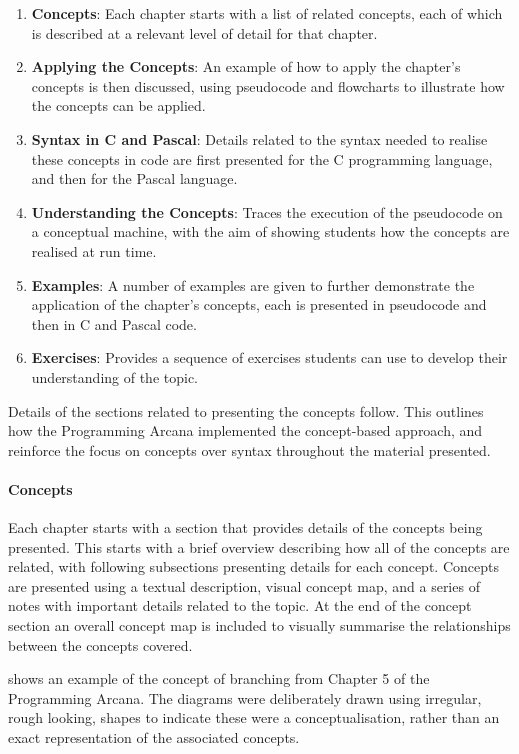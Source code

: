 \begin{enumerate}
  \item \textbf{Concepts}: Each chapter starts with a list of related concepts, each of which is described at a relevant level of detail for that chapter.
  \item \textbf{Applying the Concepts}: An example of how to apply the chapter's concepts is then discussed, using pseudocode and flowcharts to illustrate how the concepts can be applied.
  \item \textbf{Syntax in C and Pascal}: Details related to the syntax needed to realise these concepts in code are first presented for the C programming language, and then for the Pascal language.
  \item \textbf{Understanding the Concepts}: Traces the execution of the pseudocode on a conceptual machine, with the aim of showing students how the concepts are realised at run time. 
  \item \textbf{Examples}: A number of examples are given to further demonstrate the application of the chapter's concepts, each is presented in pseudocode and then in C and Pascal code.
  \item \textbf{Exercises}: Provides a sequence of exercises students can use to develop their understanding of the topic.
\end{enumerate}

Details of the sections related to presenting the concepts follow. This outlines how the Programming Arcana implemented the concept-based approach, and reinforce the focus on concepts over syntax throughout the material presented. 

\clearpage
\paragraph{Concepts} %
\label{par:concepts}

Each chapter starts with a section that provides details of the concepts being presented. This starts with a brief overview describing how all of the concepts are related, with following subsections presenting details for each concept. Concepts are presented using a textual description, visual concept map, and a series of notes with important details related to the topic. At the end of the concept section an overall concept map is included to visually summarise the relationships between the concepts covered. 

 shows an example of the concept of branching from Chapter 5 of the Programming Arcana. The diagrams were deliberately drawn using irregular, rough looking, shapes to indicate these were a conceptualisation, rather than an exact representation of the associated concepts.

